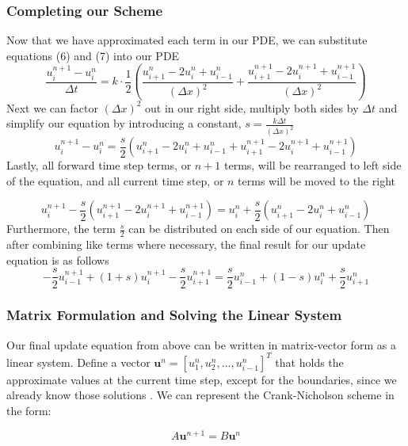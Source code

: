 \documentclass[12pt, reqno]{amsart}
\begin{document}
\subsubsection{Completing our Scheme}
Now that we have approximated each term in our PDE, we can substitute equations (6) and (7) into our PDE
\begin{equation*}
\frac{u_i^{n+1} - u_i^n}{\Delta t} = k \cdot \frac{1}{2} \left( 
\frac{u_{i+1}^n - 2u_i^n + u_{i-1}^n}{(\Delta x)^2} + 
\frac{u_{i+1}^{n+1} - 2u_i^{n+1} + u_{i-1}^{n+1}}{(\Delta x)^2} 
\right)
\end{equation*}
Next we can factor $(\Delta x)^2$ out in our right side, multiply both sides by $\Delta t$  and simplify our equation by introducing a constant, $s = \frac{k\Delta t}{(\Delta x)^2}$
\begin{equation*}
u_i^{n+1} - u_i^n = \frac{s}{2}\left( 
u_{i+1}^n - 2u_i^n + u_{i-1}^n + 
u_{i+1}^{n+1} - 2u_i^{n+1} + u_{i-1}^{n+1}
\right)
\end{equation*}
Lastly, all forward time step terms, or $n + 1$ terms, will be rearranged to left side of the equation, and all current time step, or $n$ terms will be moved to the right

\begin{equation*}
u_i^{n+1} - \frac{s}{2}\left(u_{i+1}^{n+1} - 2u_i^{n+1} + u_{i-1}^{n+1}\right)
= u_i^n + \frac{s}{2}\left(u_{i+1}^{n} - 2u_i^{n} + u_{i-1}^{n}\right)
\end{equation*}
Furthermore, the term $\frac{s}{2}$ can be distributed on each side of our equation. Then after combining like terms where necessary, the final result for our update equation is as follows
\begin{equation*}
-\frac{s}{2}u_{i-1}^{n+1} + (1+s)u_i^{n+1}-\frac{s}{2}u_{i+1}^{n+1} = \frac{s}{2}u_{i - 1}^n + (1 - s)u_i^n+\frac{s}{2}u_{i+1}^n
\end{equation*}
\subsubsection{Matrix Formulation and Solving the Linear System}
Our final update equation from above can be written in matrix-vector form as a linear system. Define a vector $\mathbf{u}^n = [u_1^n, u_2^n, ..., u_{i-1}^n]^T$ that holds the approximate values at the current time step, except for the boundaries, since we already know those solutions \cite{3}. We can represent the Crank-Nicholson scheme in the form:

\[
A \mathbf{u}^{n+1} = B \mathbf{u}^{n}
\]
\end{document}
